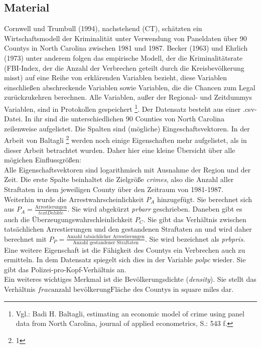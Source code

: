 \subsection{Material}
Cornwell und Trumbull (1994), nachstehend (CT), schätzten ein Wirtschaftsmodell der Kriminalität unter Verwendung von Paneldaten über 90 Countys in North Carolina zwischen 1981 und 1987. Becker (1963) und Ehrlich (1973) unter anderem folgen das empirische Modell, der die Kriminalitätsrate (FBI-Index, der die Anzahl der Verbrechen geteilt durch die Kreisbevölkerung misst) auf eine Reihe von erklärenden Variablen bezieht, diese Variablen einschließen abschreckende Variablen sowie Variablen, die die Chancen zum Legal zurückzukehren berechnen. Alle Variablen, außer der Regional- und Zeitdummys Variablen, sind in Protokollen gespeichert \footnote{Vgl.: Badi H. Baltagli, estimating an economic model of crime using panel data from North Carolina, journal of applied econometrics, S.: 543 f.}.
Der Datensatz besteht aus einer .csv-Datei.
In ihr sind die unterschiedlichen 90 Counties von North Carolina zeilenweise aufgelistet.
Die Spalten sind (m\"ogliche) Eingeschaftsvektoren.
In der Arbeit von Baltagli \footnote{1} werden noch einige Eigenschaften mehr aufgelistet, als in dieser Arbeit betrachtet wurden. Daher hier eine kleine \"Ubersicht über alle m\"ogichen Einflussgr\"o\ss{}en: \\
Alle Eigenschaftsvektoren sind logarithmisch mit Ausnahme der Region und der Zeit.
Die erste Spalte beinhaltet die Zielgr\"o\ss{}e \textit{crimes}, also die Anzahl aller Straftaten in dem jeweiligen County \"uber den Zeitraum von 1981-1987. \\
Weiterhin wurde die Arrestwahrscheinlichkeit $P_A$ hinzugef\"ugt. Sie berechnet sich aus $P_A = \frac{\text{Arrestierungen}}{text{Delikte}}$. Sie wird abgek\"urzt \textit{prbarr} geschrieben.
Daneben gibt es auch die \"Uberzeugungswahrschleinlichkeit $P_C$. Sie gibt das Verh\"altnis zwischen tats\"achlichen Arrestierungen und den gestandenen Straftaten an und wird daher berechnet mit $P_P = \frac{\text{Anzahl tats\"achlicher Arrestierungen}}{\text{Anzahl gestandener Straftaten}}$. Sie wird bezeichnet als \textit{prbpris}. \\
Eine weitere Eigenschaft ist die Fähigkeit des Countys ein Verbrechen auch zu ermitteln. In dem Datensatz spiegelt sich dies in der Variable \textit{polpc} wieder. Sie gibt das Polizei-pro-Kopf-Verhältnis an. \\
Ein weiteres wichtiges Merkmal ist die Bev\"olkerungsdichte (\textit{density}). Sie stellt das Verhältnis $frac{\text{anzahl bev\"olkerung}}{\text{Fl\"ache des Countys in square miles}}$ dar. \\
